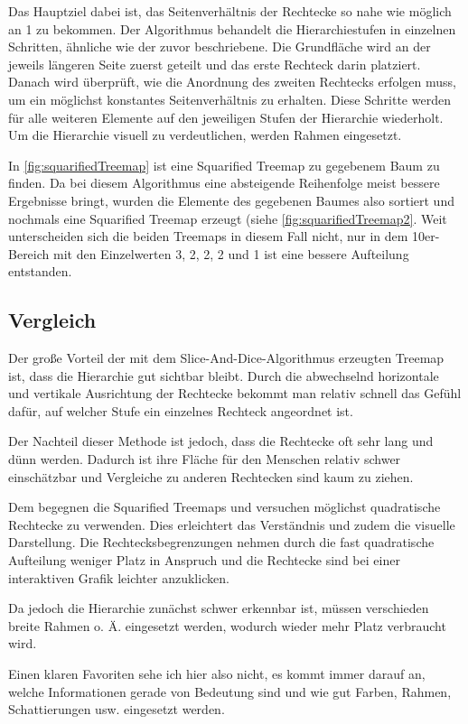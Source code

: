 \documentclass[a4paper,12pt,ngerman]{scrartcl}
\begin{document}
Das Hauptziel dabei ist, das Seitenverhältnis der Rechtecke so nahe wie möglich an 1 zu bekommen. Der Algorithmus behandelt die Hierarchiestufen in einzelnen Schritten, ähnliche wie der zuvor beschriebene. Die Grundfläche wird an der jeweils längeren Seite zuerst geteilt und das erste Rechteck darin platziert. Danach wird überprüft, wie die Anordnung des zweiten Rechtecks erfolgen muss, um ein möglichst konstantes Seitenverhältnis zu erhalten. Diese Schritte werden für alle weiteren Elemente auf den jeweiligen Stufen der Hierarchie wiederholt. Um die Hierarchie visuell zu verdeutlichen, werden Rahmen eingesetzt.

In \cref{fig:squarifiedTreemap} ist eine Squarified Treemap zu gegebenem Baum zu finden. Da bei diesem Algorithmus eine absteigende Reihenfolge meist bessere Ergebnisse bringt, wurden die Elemente des gegebenen Baumes also sortiert und nochmals eine Squarified Treemap erzeugt (siehe \cref{fig:squarifiedTreemap2}. Weit unterscheiden sich die beiden Treemaps in diesem Fall nicht, nur in dem 10er-Bereich mit den Einzelwerten 3, 2, 2, 2 und 1 ist eine bessere Aufteilung entstanden.

\subsection*{Vergleich}

Der große Vorteil der mit dem Slice-And-Dice-Algorithmus erzeugten Treemap ist, dass die Hierarchie gut sichtbar bleibt. Durch die abwechselnd horizontale und vertikale Ausrichtung der Rechtecke bekommt man relativ schnell das Gefühl dafür, auf welcher Stufe ein einzelnes Rechteck angeordnet ist.

Der Nachteil dieser Methode ist jedoch, dass die Rechtecke oft sehr lang und dünn werden. Dadurch ist ihre Fläche für den Menschen relativ schwer einschätzbar und Vergleiche zu anderen Rechtecken sind kaum zu ziehen.

Dem begegnen die Squarified Treemaps und versuchen möglichst quadratische Rechtecke  zu verwenden. Dies erleichtert das Verständnis und zudem die visuelle Darstellung. Die Rechtecksbegrenzungen nehmen durch die fast quadratische Aufteilung weniger Platz in Anspruch und die Rechtecke sind bei einer interaktiven Grafik leichter anzuklicken.

Da jedoch die Hierarchie zunächst schwer erkennbar ist, müssen verschieden breite Rahmen o. Ä. eingesetzt werden, wodurch wieder mehr Platz verbraucht wird.

Einen klaren Favoriten sehe ich hier also nicht, es kommt immer darauf an, welche Informationen gerade von Bedeutung sind und wie gut Farben, Rahmen, Schattierungen usw. eingesetzt werden.
\end{document}
